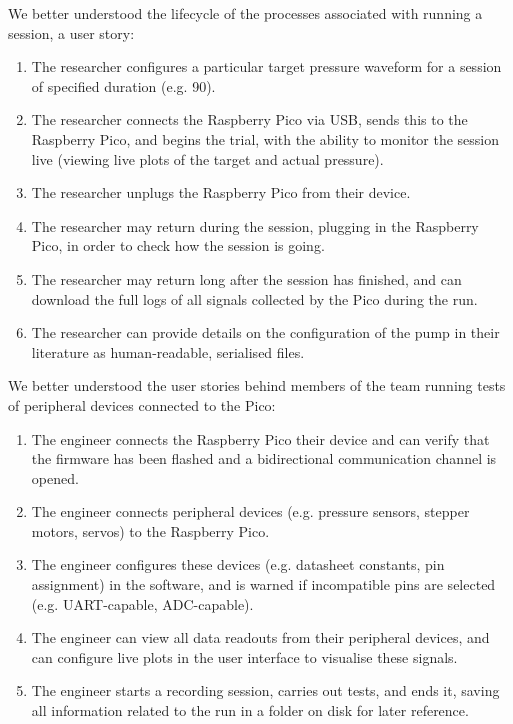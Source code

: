 \documentclass[10pt, a4paper]{article}
\begin{document}
We better understood the lifecycle of the processes associated with running a session, a user story:

\begin{enumerate}[noitemsep]
  \item The researcher configures a particular target pressure waveform for a session of specified duration (e.g. \SI{90}{\min}).
  \item The researcher connects the Raspberry Pico via USB, sends this to the Raspberry Pico, and begins the trial, with the ability to monitor the session live (viewing live plots of the target and actual pressure).
  \item The researcher unplugs the Raspberry Pico from their device.
  \item The researcher may return during the session, plugging in the Raspberry Pico, in order to check how the session is going.
  \item The researcher may return long after the session has finished, and can download the full logs of all signals collected by the Pico during the run.
  \item The researcher can provide details on the configuration of the pump in their literature as human-readable, serialised files.
\end{enumerate}

We better understood the user stories behind members of the team running tests of peripheral devices connected to the Pico:

\begin{enumerate}[noitemsep]
  \item The engineer connects the Raspberry Pico their device and can verify that the firmware has been flashed and a bidirectional communication channel is opened.
  \item The engineer connects peripheral devices (e.g. pressure sensors, stepper motors, servos) to the Raspberry Pico.
  \item The engineer configures these devices (e.g. datasheet constants, pin assignment) in the software, and is warned if incompatible pins are selected (e.g. UART-capable, ADC-capable).
  \item The engineer can view all data readouts from their peripheral devices, and can configure live plots in the user interface to visualise these signals.
  \item The engineer starts a recording session, carries out tests, and ends it, saving all information related to the run in a folder on disk for later reference.
\end{enumerate}
\end{document}
